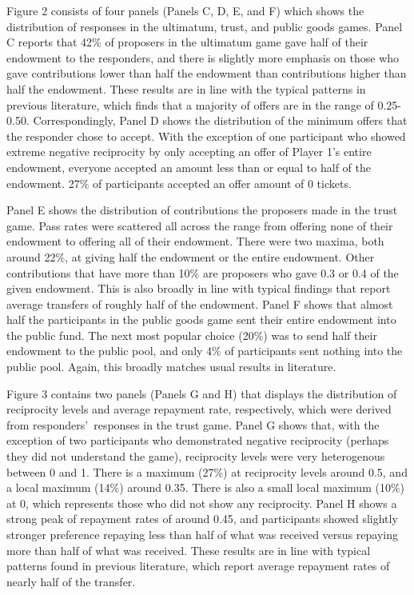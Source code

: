 \documentclass[12pt]{article}
\begin{document}
Figure 2 consists of four panels (Panels C, D, E, and F) which shows the distribution of responses in the ultimatum, trust, and public goods games. Panel C reports that 42\% of proposers in the ultimatum game gave half of their endowment to the responders, and there is slightly more emphasis on those who gave contributions lower than half the endowment than contributions higher than half the endowment. These results are in line with the typical patterns in previous literature, which finds that a majority of offers are in the range of 0.25-0.50. Correspondingly, Panel D shows the distribution of the minimum offers that the responder chose to accept. With the exception of one participant who showed extreme negative reciprocity by only accepting an offer of Player 1's entire endowment, everyone accepted an amount less than or equal to half of the endowment. 27\% of participants accepted an offer amount of 0 tickets. 

Panel E shows the distribution of contributions the proposers made in the trust game. Pass rates were scattered all across the range from offering none of their endowment to offering all of their endowment. There were two maxima, both around 22\%, at giving half the endowment or the entire endowment. Other contributions that have more than 10\% are proposers who gave 0.3 or 0.4 of the given endowment. This is also broadly in line with typical findings that report average transfers of roughly half of the endowment. Panel F shows that almost half the participants in the public goods game sent their entire endowment into the public fund. The next most popular choice (20\%) was to send half their endowment to the public pool, and only 4\% of participants sent nothing into the public pool. Again, this broadly matches usual results in literature.

Figure 3 contains two panels (Panels G and H) that displays the distribution of reciprocity levels and average repayment rate, respectively, which were derived from responders\rq \ responses in the trust game. Panel G shows that, with the exception of two participants who demonstrated negative reciprocity (perhaps they did not understand the game), reciprocity levels were very heterogenous between 0 and 1. There is a maximum (27\%) at reciprocity levels around 0.5, and a local maximum (14\%) around 0.35. There is also a small local maximum (10\%) at 0, which represents those who did not show any reciprocity. Panel H shows a strong peak of repayment rates of around 0.45, and participants showed slightly stronger preference repaying less than half of what was received versus repaying more than half of what was received. These results are in line with typical patterns found in previous literature, which report average repayment rates of nearly half of the transfer.
\end{document}
